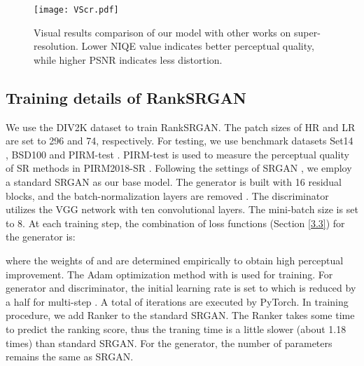 \documentclass[10pt,twocolumn,letterpaper]{article}
\begin{document}
\begin{figure*}[h]
\setlength{\abovecaptionskip}{-0.2cm}
\setlength{\belowcaptionskip}{-0.1cm}
\begin{center}
\texttt{[image: VScr.pdf]} 
\end{center}
   \caption{Visual results comparison of our model with other works on  super-resolution. Lower NIQE value indicates better perceptual quality, while higher PSNR indicates less distortion.}
\label{fig:Visual results}
\vskip -0.5cm
\end{figure*}

\subsection{Training details of RankSRGAN}
\label{4.2}
We use the DIV2K \cite{agustsson2017ntire} dataset to train RankSRGAN. The patch sizes of HR and LR are set to 296 and 74, respectively. For testing, we use benchmark datasets Set14 \cite{zeyde2010single}, BSD100 \cite{martin2001database} and PIRM-test \cite{blau20182018}. PIRM-test is used to measure the
perceptual quality of SR methods in PIRM2018-SR \cite{blau20182018}. Following the settings of SRGAN \cite{ledig2017photo}, we employ a standard SRGAN \cite{ledig2017photo} as our base model. The generator is built with 16 residual blocks, and the batch-normalization layers are removed \cite{Wang_2018_ECCV_Workshops}. The discriminator utilizes the VGG network \cite{simonyan2014very} with ten convolutional layers. The mini-batch size is set to 8. At each training step, the combination of loss functions (Section \ref{3.3}) for the generator is:
\vskip -0.2cm

where the weights of  and  are determined empirically to obtain high perceptual improvement\cite{choi2018deep,ledig2017photo,Wang_2018_ECCV_Workshops}. The Adam\cite{kingma2014adam} optimization method with  is used for training. For generator and discriminator, the initial learning rate is set to  which is reduced by a half for multi-step . A total of  iterations are executed by PyTorch. 
In training procedure, we add Ranker to the standard SRGAN. The Ranker takes some time to predict the ranking score, thus the traning time is a little slower (about 1.18 times) than standard SRGAN\cite{ledig2017photo}. For the generator, the number of parameters remains the same as SRGAN\cite{ledig2017photo}.
\end{document}
